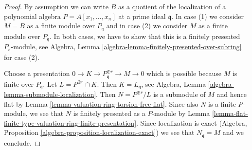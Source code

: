 \documentclass[10pt,a4paper]{amsart}
\theoremstyle{plain}
\theoremstyle{definition}
\theoremstyle{remark}
\numberwithin{equation}{subsection}
\begin{document}
\begin{proof}
By assumption we can write $B$ as a quotient of the localization of
a polynomial algebra $P = A[x_1, \ldots, x_n]$ at a prime ideal $\mathfrak q$.
In case (1) we consider $M = B$ as a finite module over
$P_\mathfrak q$ and in case (2) we consider $M$ as a finite module over
$P_\mathfrak q$. In both cases, we have to show that this is a
finitely presented $P_\mathfrak q$-module, see
Algebra, Lemma \ref{algebra-lemma-finitely-presented-over-subring}
for case (2).

\medskip\noindent
Choose a presentation $0 \to K \to P_\mathfrak q^{\oplus r} \to M \to 0$
which is possible because $M$ is finite over $P_\mathfrak q$.
Let $L = P^{\oplus r} \cap K$. Then $K = L_\mathfrak q$, see
Algebra, Lemma \ref{algebra-lemma-submodule-localization}.
Then $N = P^{\oplus r}/L$ is a submodule of $M$ and hence flat by
Lemma \ref{lemma-valuation-ring-torsion-free-flat}.
Since also $N$ is a finite $P$-module, we see that $N$ is finitely
presented as a $P$-module by
Lemma \ref{lemma-flat-finite-type-valuation-ring-finite-presentation}.
Since localization is exact
(Algebra, Proposition \ref{algebra-proposition-localization-exact})
we see that $N_\mathfrak q = M$ and we conclude.
\end{proof}
\end{document}
